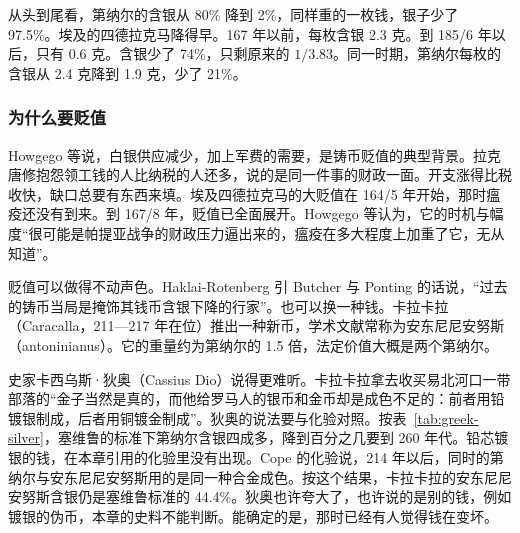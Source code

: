 从头到尾看，第纳尔的含银从 80\% 降到 2\%，同样重的一枚钱，银子少了 97.5\%。埃及的四德拉克马降得早。167 年以前，每枚含银 2.3 克。到 185/6 年以后，只有 0.6 克。含银少了 74\%，只剩原来的 $1/3.83$。同一时期，第纳尔每枚的含银从 2.4 克降到 1.9 克，少了 21\%\cite{howgego2010}。

\subsubsection{为什么要贬值}
Howgego 等说，白银供应减少，加上军费的需要，是铸币贬值的典型背景\cite{howgego2010}。拉克唐修抱怨领工钱的人比纳税的人还多，说的是同一件事的财政一面。开支涨得比税收快，缺口总要有东西来填。埃及四德拉克马的大贬值在 164/5 年开始，那时瘟疫还没有到来。到 167/8 年，贬值已全面展开。Howgego 等认为，它的时机与幅度“很可能是帕提亚战争的财政压力逼出来的，瘟疫在多大程度上加重了它，无从知道”\cite{howgego2010}。

贬值可以做得不动声色。Haklai-Rotenberg 引 Butcher 与 Ponting 的话说，“过去的铸币当局是掩饰其钱币含银下降的行家”\cite{haklai2011}。也可以换一种钱。卡拉卡拉（Caracalla，211—217 年在位）推出一种新币，学术文献常称为安东尼尼安努斯（antoninianus）。它的重量约为第纳尔的 1.5 倍，法定价值大概是两个第纳尔\cite{haklai2011}。

史家卡西乌斯·狄奥（Cassius Dio）说得更难听。卡拉卡拉拿去收买易北河口一带部落的“金子当然是真的，而他给罗马人的银币和金币却是成色不足的：前者用铅镀银制成，后者用铜镀金制成”\cite{dio78}。狄奥的说法要与化验对照。按表~\ref{tab:greek-silver}，塞维鲁的标准下第纳尔含银四成多，降到百分之几要到 260 年代。铅芯镀银的钱，在本章引用的化验里没有出现。Cope 的化验说，214 年以后，同时的第纳尔与安东尼尼安努斯用的是同一种合金成色\cite{cope1974}。按这个结果，卡拉卡拉的安东尼尼安努斯含银仍是塞维鲁标准的 44.4\%。狄奥也许夸大了，也许说的是别的钱，例如镀银的伪币，本章的史料不能判断。能确定的是，那时已经有人觉得钱在变坏。


